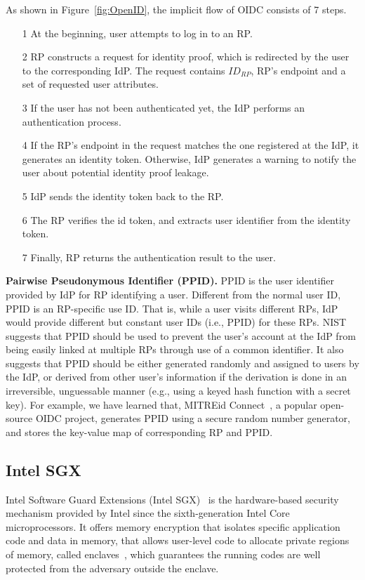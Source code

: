 As shown in Figure~\ref{fig:OpenID}, the implicit flow of OIDC consists of 7 steps.
\begin{itemize}
\item[1] At the beginning, user attempts to log in to an RP.
\item[2] RP constructs a request for identity proof, which is redirected by the user to the corresponding IdP. The request contains $ID_{RP}$, RP's endpoint and a set of requested user attributes.
\item[3] If the user has not been authenticated yet, the IdP performs an authentication process.
\item[4] If the RP's endpoint in the request matches the one registered at the IdP, it generates an identity token. Otherwise, IdP generates a warning to notify the user about potential identity proof leakage.
\item[5] IdP sends the identity token back to the RP.
\item[6] The RP verifies the id token, and extracts user identifier from the identity token.
\item[7] Finally, RP returns the authentication result to the user.
\end{itemize}

\vspace{3mm}\noindent\textbf{Pairwise Pseudonymous Identifier (PPID).} 
PPID is the user identifier provided by IdP for RP identifying a user. Different from the normal user ID, PPID is an RP-specific use ID. That is, while a user visits different RPs, IdP would provide different but constant user IDs (i.e., PPID) for these RPs.    
NIST~\cite{NIST2017draft} suggests that PPID should be used to prevent the user's account at the IdP from being easily linked at multiple RPs through use of a common identifier. 
It also suggests that PPID should be either generated randomly and assigned to users by the IdP, or derived from other user's information if the derivation is done in an irreversible, unguessable manner (e.g., using a keyed hash function with a secret key). For example, we have learned that, MITREid Connect~\cite{MITREid}, a popular open-source OIDC project, generates PPID using a secure random number generator, and stores the key-value map of corresponding RP and PPID.


\subsection{Intel SGX}
Intel Software Guard Extensions (Intel SGX)~\cite{costan2016intel} is the hardware-based security  mechanism provided by Intel since the sixth-generation Intel Core microprocessors. It offers memory encryption that isolates specific application code and data in memory, that allows user-level code to allocate private regions of memory, called enclaves~\cite{costan2016intel}, which guarantees the running codes are well protected from the adversary outside the enclave.
 
